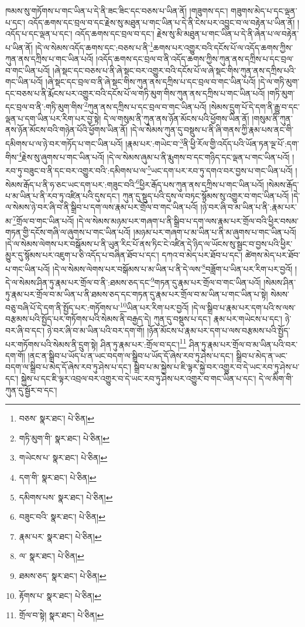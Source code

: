 ཁམས་སུ་གཏོགས་པ་གང་ཡིན་པ་དེ་ནི་ཟང་ཟིང་དང་བཅས་པ་ཡིན་ནོ། །གཟུགས་དང་། གཟུགས་མེད་པ་དང་ལྡན་པ་དང་། འདོད་ཆགས་དང་བྲལ་བ་དང་རྗེས་སུ་མཐུན་པ་གང་ཡིན་པ་དེ་ནི་ངེས་པར་འབྱུང་བ་ལ་བརྟེན་པ་ཡིན་ནོ། །འདོད་པ་དང་ལྡན་པ་དང་། འདོད་ཆགས་དང་བྲལ་བ་དང་། རྗེས་སུ་མི་མཐུན་པ་གང་ཡིན་པ་དེ་ནི་ཞེན་པ་ལ་བརྟེན་པ་ཡིན་ནོ། །དེ་ལ་སེམས་འདོད་ཆགས་དང་:བཅས་པ་ནི་\footnote{བཅས་  སྣར་ཐང་།  པེ་ཅིན། }ཆགས་པར་འགྱུར་བའི་དངོས་པོ་ལ་འདོད་ཆགས་ཀྱིས་ཀུན་ནས་དཀྲིས་པ་གང་ཡིན་པའོ། །འདོད་ཆགས་དང་བྲལ་བ་ནི་འདོད་ཆགས་ཀྱིས་ཀུན་ནས་དཀྲིས་པ་དང་བྲལ་བ་གང་ཡིན་པའོ། །ཞེ་སྡང་དང་བཅས་པ་ནི་ཞེ་སྡང་བར་འགྱུར་བའི་དངོས་པོ་ལ་ཞེ་སྡང་གིས་ཀུན་ནས་དཀྲིས་པའི་གང་ཡིན་པའོ། །ཞེ་སྡང་དང་བྲལ་བ་ནི་ཞེ་སྡང་གིས་ཀུན་ནས་དཀྲིས་པ་དང་བྲལ་བ་གང་ཡིན་པའོ། །དེ་ལ་གཏི་མུག་དང་བཅས་པ་ནི་རྨོངས་པར་འགྱུར་བའི་དངོས་པོ་ལ་གཏི་མུག་གིས་ཀུན་ནས་དཀྲིས་པ་གང་ཡིན་པའོ། །གཏི་མུག་དང་བྲལ་བ་ནི་:གཏི་མུག་གིས་\footnote{གཏི་མུག་གི་  སྣར་ཐང་།  པེ་ཅིན། }ཀུན་ནས་དཀྲིས་པ་དང་བྲལ་བ་གང་ཡིན་པའོ། །སེམས་དྲུག་པོ་དེ་དག་ནི་རྒྱུ་བ་དང་ལྡན་པ་དག་ཡིན་པར་རིག་པར་བྱ་སྟེ། དེ་ལ་གསུམ་ནི་ཀུན་ནས་ཉོན་མོངས་པའི་ཕྱོགས་ཡིན་ནོ། །གསུམ་ནི་ཀུན་ནས་ཉོན་མོངས་བའི་གཉེན་པོའི་ཕྱོགས་ཡིན་ནོ། །དེ་ལ་སེམས་ཀུན་དུ་བསྡུས་པ་ནི་ཞི་གནས་ཀྱི་རྣམ་པས་ནང་གི་དམིགས་པ་ལ་ཉེ་བར་གཏོད་པ་གང་ཡིན་པའོ། །རྣམ་པར་:གཡེང་བ་\footnote{གཡེངས་པ་  སྣར་ཐང་།  པེ་ཅིན། }ནི་ཕྱི་རོལ་གྱི་འདོད་པའི་ཡོན་ཏན་ལྔ་པོ་:དག་གིས་\footnote{དག་གི་  སྣར་ཐང་།  པེ་ཅིན། }རྗེས་སུ་ཞུགས་པ་གང་ཡིན་པའོ། །དེ་ལ་སེམས་ཞུམ་པ་ནི་རྨུགས་བ་དང་གཉིད་དང་ལྡན་པ་གང་ཡིན་པའོ། །རབ་ཏུ་བཟུང་བ་ནི་དང་བར་འགྱུར་བའི་:དམིགས་པ་ལ་\footnote{དམིགས་པས་  སྣར་ཐང་།  པེ་ཅིན། }ཡང་དག་པར་རབ་ཏུ་དགའ་བར་བྱས་པ་གང་ཡིན་པའོ། །སེམས་རྒོད་པ་ནི་ཧ་ཅང་ཡང་དག་པར་:གཟུང་བའི་\footnote{བཟུང་བའི་  སྣར་ཐང་།  པེ་ཅིན། }ཕྱིར་རྒོད་པས་ཀུན་ནས་དཀྲིས་པ་གང་ཡིན་པའོ། །སེམས་རྒོད་པ་མ་ཡིན་པ་ནི་རབ་ཏུ་འཛིན་པའི་དུས་དང་། ཀུན་དུ་སྡུད་པའི་དུས་ལ་བཏང་སྙོམས་སུ་འགྱུར་བ་གང་ཡིན་པའོ། །དེ་ལ་སེམས་ཉེ་བར་ཞི་བ་ནི་སྒྲིབ་པ་དག་ལས་རྣམ་པར་གྲོལ་བ་གང་ཡིན་པའོ། །ཉེ་བར་ཞི་བ་མ་ཡིན་པ་ནི་:རྣམ་པར་མ་\footnote{རྣམ་པར་  སྣར་ཐང་།  པེ་ཅིན། }གྲོལ་བ་གང་ཡིན་པའོ། །དེ་ལ་སེམས་མཉམ་པར་གཞག་པ་ནི་སྒྲིབ་པ་དག་ལས་རྣམ་པར་གྲོལ་བའི་ཕྱིར་བསམ་གཏན་གྱི་དངོས་གཞི་ལ་ཞུགས་པ་གང་ཡིན་པའོ། །མཉམ་པར་གཞག་པ་མ་ཡིན་པ་ནི་མ་ཞུགས་པ་གང་ཡིན་པའོ། །དེ་ལ་སེམས་ལེགས་པར་བསྒོམས་པ་ནི་ཡུན་རིང་པོ་ནས་ཏིང་ངེ་འཛིན་དེ་ཉིད་ལ་ཡོངས་སུ་སྦྱང་བ་བྱས་པའི་ཕྱིར་མྱུར་དུ་སྙོམས་པར་འཇུག་པ་ཅི་འདོད་པ་བཞིན་ཐོབ་པ་དང་། དཀའ་བ་མེད་པར་ཐོབ་པ་དང་། ཚེགས་མེད་པར་ཐོབ་པ་གང་ཡིན་པའོ། །དེ་ལ་སེམས་ལེགས་པར་བསྒོམས་པ་མ་ཡིན་པ་ནི་དེ་ལས་\footnote{ལ་  སྣར་ཐང་།  པེ་ཅིན། }བཟློག་པ་ཡིན་པར་རིག་པར་བྱའོ། །དེ་ལ་སེམས་ཤིན་ཏུ་རྣམ་པར་གྲོལ་བ་ནི་:ཐམས་ཅད་དང་\footnote{ཐམས་ཅད་  སྣར་ཐང་།  པེ་ཅིན། }གཏན་དུ་རྣམ་པར་གྲོལ་བ་གང་ཡིན་པའོ། །སེམས་ཤིན་ཏུ་རྣམ་པར་གྲོལ་བ་མ་ཡིན་པ་ནི་ཐམས་ཅད་དང་གཏན་དུ་རྣམ་པར་གྲོལ་བ་མ་ཡིན་པ་གང་ཡིན་པ་སྟེ། སེམས་བཅུ་བཞི་པོ་དེ་དག་ནི་སྤྱོད་པར་:གཏོགས་པ་\footnote{རྟོགས་པ་  སྣར་ཐང་།  པེ་ཅིན། }ཡིན་པར་རིག་པར་བྱའོ། །དེ་ལ་སྒྲིབ་པ་རྣམ་པར་དག་པའི་ས་ལས་བརྩམས་པའི་སྤྱོད་པར་གཏོགས་པའི་སེམས་ནི་བརྒྱད་དེ། ཀུན་དུ་བསྡུས་པ་དང་། རྣམ་པར་གཡེངས་པ་དང་། ཉེ་བར་ཞི་བ་དང་། ཉེ་བར་ཞི་བ་མ་ཡིན་པའི་བར་དག་གོ། །ཉོན་མོངས་པ་རྣམ་པར་དག་པ་ལས་བརྩམས་པའི་སྤྱོད་པར་གཏོགས་པའི་སེམས་ནི་དྲུག་སྟེ། ཤིན་ཏུ་རྣམ་པར་:གྲོལ་བ་དང་།\footnote{གྲོལ་བ་སྟེ།  སྣར་ཐང་།  པེ་ཅིན། } ཤིན་ཏུ་རྣམ་པར་གྲོལ་བ་མ་ཡིན་པའི་བར་དག་གོ། །ནང་ན་སྒྲིབ་པ་ཡོད་པ་ན་ཡང་བདག་ལ་སྒྲིབ་པ་ཡོད་དོ་ཞེས་རབ་ཏུ་ཤེས་པ་དང་། སྒྲིབ་པ་མེད་ན་ཡང་བདག་ལ་སྒྲིབ་པ་མེད་དོ་ཞེས་རབ་ཏུ་ཤེས་པ་དང་། སྒྲིབ་པ་མ་སྐྱེས་པ་ཇི་ལྟར་སྐྱེ་བར་འགྱུར་བ་དེ་ཡང་རབ་ཏུ་ཤེས་པ་དང་། སྐྱེས་པ་དང་ཇི་ལྟར་འབྲལ་བར་འགྱུར་བ་དེ་ཡང་རབ་ཏུ་ཤེས་པར་འགྱུར་བ་གང་ཡིན་པ་དང་། དེ་ལ་མིག་གི་ཀུན་དུ་སྦྱོར་བ་དང་། 
